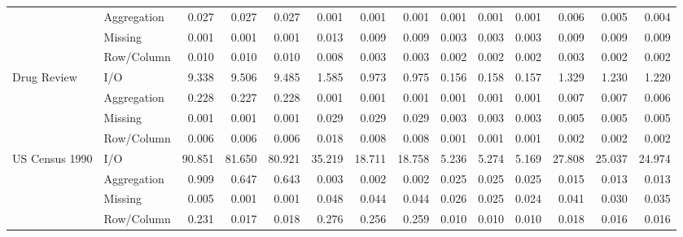 \begin{tabular}{llrrrrrrrrrrrr}
 & Aggregation & 0.027 & 0.027 & 0.027 & 0.001 & 0.001 & 0.001 & 0.001 & 0.001 & 0.001 & 0.006 & 0.005 & 0.004 \\
 & Missing & 0.001 & 0.001 & 0.001 & 0.013 & 0.009 & 0.009 & 0.003 & 0.003 & 0.003 & 0.009 & 0.009 & 0.009 \\
 & Row/Column & 0.010 & 0.010 & 0.010 & 0.008 & 0.003 & 0.003 & 0.002 & 0.002 & 0.002 & 0.003 & 0.002 & 0.002 \\
\cline{1-14}
\multirow[t]{4}{*}{Drug Review} & I/O & 9.338 & 9.506 & 9.485 & 1.585 & 0.973 & 0.975 & 0.156 & 0.158 & 0.157 & 1.329 & 1.230 & 1.220 \\
 & Aggregation & 0.228 & 0.227 & 0.228 & 0.001 & 0.001 & 0.001 & 0.001 & 0.001 & 0.001 & 0.007 & 0.007 & 0.006 \\
 & Missing & 0.001 & 0.001 & 0.001 & 0.029 & 0.029 & 0.029 & 0.003 & 0.003 & 0.003 & 0.005 & 0.005 & 0.005 \\
 & Row/Column & 0.006 & 0.006 & 0.006 & 0.018 & 0.008 & 0.008 & 0.001 & 0.001 & 0.001 & 0.002 & 0.002 & 0.002 \\
\cline{1-14}
\multirow[t]{4}{*}{US Census 1990} & I/O & 90.851 & 81.650 & 80.921 & 35.219 & 18.711 & 18.758 & 5.236 & 5.274 & 5.169 & 27.808 & 25.037 & 24.974 \\
 & Aggregation & 0.909 & 0.647 & 0.643 & 0.003 & 0.002 & 0.002 & 0.025 & 0.025 & 0.025 & 0.015 & 0.013 & 0.013 \\
 & Missing & 0.005 & 0.001 & 0.001 & 0.048 & 0.044 & 0.044 & 0.026 & 0.025 & 0.024 & 0.041 & 0.030 & 0.035 \\
 & Row/Column & 0.231 & 0.017 & 0.018 & 0.276 & 0.256 & 0.259 & 0.010 & 0.010 & 0.010 & 0.018 & 0.016 & 0.016 \\
\cline{1-14}
\bottomrule
\end{tabular}
